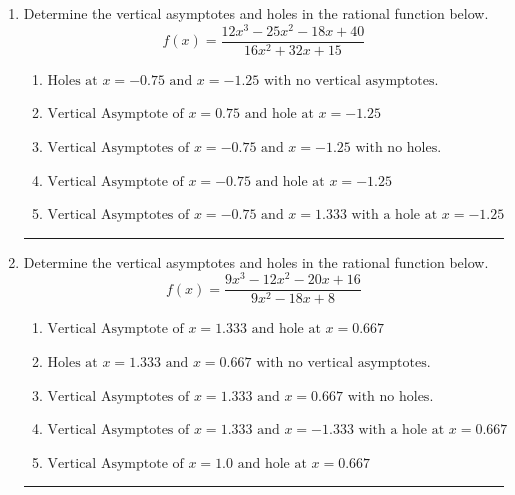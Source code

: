 \documentclass[14pt]{extbook}
\newcommand{\litem}[1]{\item#1\hspace*{-1cm}\rule{\textwidth}{0.4pt}}
\begin{document}
\begin{enumerate}
\litem{
Determine the vertical asymptotes and holes in the rational function below.\[ f(x) = \frac{12x^{3} -25 x^{2} -18 x + 40}{16x^{2} +32 x + 15} \]\begin{enumerate}[label=\Alph*.]
\item \( \text{Holes at } x = -0.75 \text{ and } x = -1.25 \text{ with no vertical asymptotes.} \)
\item \( \text{Vertical Asymptote of } x = 0.75 \text{ and hole at } x = -1.25 \)
\item \( \text{Vertical Asymptotes of } x = -0.75 \text{ and } x = -1.25 \text{ with no holes.} \)
\item \( \text{Vertical Asymptote of } x = -0.75 \text{ and hole at } x = -1.25 \)
\item \( \text{Vertical Asymptotes of } x = -0.75 \text{ and } x = 1.333 \text{ with a hole at } x = -1.25 \)

\end{enumerate} }
\litem{
Determine the vertical asymptotes and holes in the rational function below.\[ f(x) = \frac{9x^{3} -12 x^{2} -20 x + 16}{9x^{2} -18 x + 8} \]\begin{enumerate}[label=\Alph*.]
\item \( \text{Vertical Asymptote of } x = 1.333 \text{ and hole at } x = 0.667 \)
\item \( \text{Holes at } x = 1.333 \text{ and } x = 0.667 \text{ with no vertical asymptotes.} \)
\item \( \text{Vertical Asymptotes of } x = 1.333 \text{ and } x = 0.667 \text{ with no holes.} \)
\item \( \text{Vertical Asymptotes of } x = 1.333 \text{ and } x = -1.333 \text{ with a hole at } x = 0.667 \)
\item \( \text{Vertical Asymptote of } x = 1.0 \text{ and hole at } x = 0.667 \)


\end{enumerate}}
\end{enumerate}
\end{document}
